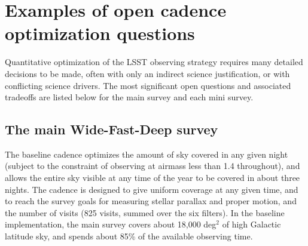 \documentclass[DM,lsstdraft,toc,usenatbib]{lsstdoc}
\begin{document}
\appendix


\section{Examples of open cadence optimization questions} 

Quantitative optimization of the LSST observing strategy requires many 
detailed decisions to be made, often with only an indirect science justification,
or with conflicting science drivers.  The most significant open questions and associated tradeoffs are listed below
for the main survey and each mini survey. 

\subsection{The main Wide-Fast-Deep survey} 

The baseline cadence optimizes the amount of sky covered in any given night (subject to 
the constraint of observing at airmass less than 1.4 throughout), and allows the entire sky 
visible at any time of the year to be covered in about three nights. The cadence is designed 
to give uniform coverage at any given time, and to reach the survey goals for measuring 
stellar parallax and proper motion, and the number of visits (825 visits, summed over the 
six filters). In the baseline implementation, the main survey covers about 18,000 deg$^2$ of 
high Galactic latitude sky, and spends about 85\% of the available observing time. 
\end{document}
